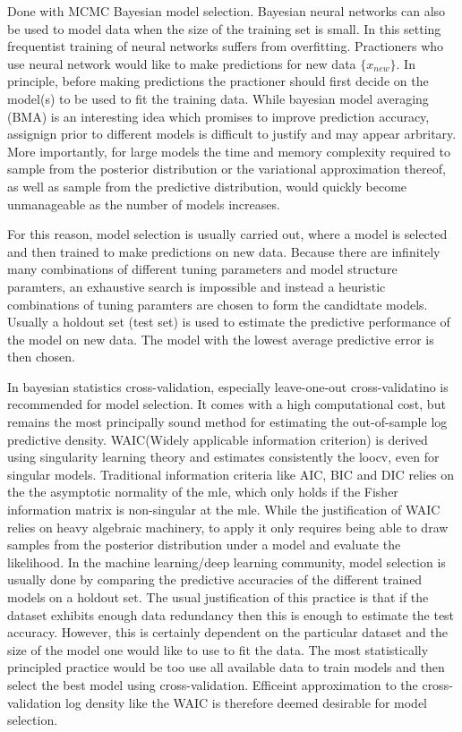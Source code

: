 \documentclass[12pt]{report}
\begin{document}
\begin{enumerate}
Done with MCMC
Bayesian model selection. 
Bayesian neural networks can also be used to model data when the size of the training set is small. In this setting frequentist training of neural networks suffers from overfitting. Practioners who use neural network would like to make predictions for new data $\{x_{new}\}$. In principle, before making predictions the practioner should first decide on the model(s) to be used to fit the training data. While bayesian model averaging (BMA) is an interesting idea which promises to improve prediction accuracy, assignign prior to different models is difficult to justify and may appear arbritary. More importantly, for large models the time and memory complexity required to sample from the posterior distribution or the variational approximation thereof, as well as sample from the predictive distribution, would quickly become unmanageable as the number of models increases. 

For this reason, model selection is usually carried out, where a model is selected and then trained to make predictions on new data. Because there are infinitely many combinations of different tuning parameters and model structure paramters, an exhaustive search is impossible and instead a heuristic combinations of tuning paramters are chosen to form the candidtate models. Usually a holdout set (test set) is used to estimate the predictive performance of the model on new data. The model with the lowest average predictive error is then chosen. 

In bayesian statistics \cite{gelman2014bayesian} cross-validation, especially leave-one-out cross-validatino is recommended for model selection. It comes with a high computational cost, but remains the most principally sound method for estimating the out-of-sample log predictive density. WAIC(Widely applicable information criterion) is derived using singularity learning theory and estimates consistently the loocv, even for singular models. Traditional information criteria like AIC, BIC and DIC relies on the the asymptotic normality of the mle, which only holds if the Fisher information matrix is non-singular at the mle. While the justification of WAIC relies on heavy algebraic machinery, to apply it only requires being able to draw samples from the posterior distribution under a model and evaluate the likelihood.  
In the machine learning/deep learning community, model selection is usually done
by comparing the predictive accuracies of the different trained models on a
holdout set. The usual justification of this practice is that if the dataset
exhibits enough data redundancy then  this is enough to estimate the test
accuracy. However, this is certainly dependent on the particular dataset and the
size of the model one would like to use to fit the data. The most statistically
principled practice would be too use all available data to train models and then
select the best model using cross-validation. Efficeint approximation to the
cross-validation log density like the WAIC is therefore deemed desirable for
model selection. 


\end{enumerate}
\end{document}
